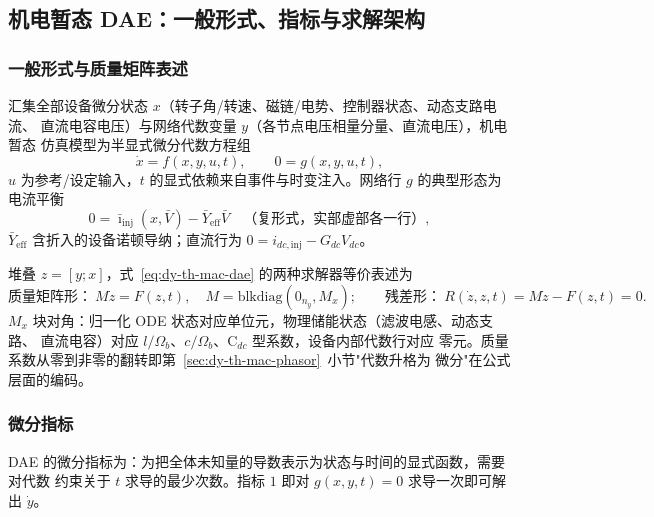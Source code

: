 \subsection{机电暂态 DAE：一般形式、指标与求解架构}\label{sec:dy-th-mac-dae}

\subsubsection{一般形式与质量矩阵表述}

汇集全部设备微分状态 $x$（转子角/转速、磁链/电势、控制器状态、动态支路电流、
直流电容电压）与网络代数变量 $y$（各节点电压相量分量、直流电压），机电暂态
仿真模型为半显式微分代数方程组
\begin{equation}
\dot x=f(x,y,u,t),\qquad 0=g(x,y,u,t),
\label{eq:dy-th-mac-dae}
\end{equation}
$u$ 为参考/设定输入，$t$ 的显式依赖来自事件与时变注入。网络行
$g$ 的典型形态为电流平衡
\begin{equation}
0=\bar\imath_{\mathrm{inj}}(x,\bar V)-\bar Y_{\mathrm{eff}}\bar V
\quad\text{（复形式，实部虚部各一行）},
\label{eq:dy-th-mac-netrow}
\end{equation}
$\bar Y_{\mathrm{eff}}$ 含折入的设备诺顿导纳；直流行为
$0=i_{dc,\mathrm{inj}}-G_{dc}V_{dc}$。

\begin{definition}[质量矩阵形与残差形]\label{def:dy-th-mac-massform}
堆叠 $z=[y;x]$，式~\eqref{eq:dy-th-mac-dae} 的两种求解器等价表述为
\begin{equation}
\text{质量矩阵形：}\ M\dot z=F(z,t),\quad M=\mathrm{blkdiag}(0_{n_y},M_x);
\qquad
\text{残差形：}\ R(\dot z,z,t)=M\dot z-F(z,t)=0 .
\label{eq:dy-th-mac-massform}
\end{equation}
$M_x$ 块对角：归一化 ODE 状态对应单位元，物理储能状态（滤波电感、动态支路、
直流电容）对应 $l/\Omega_b$、$c/\Omega_b$、C$_{dc}$ 型系数，设备内部代数行对应
零元。质量系数从零到非零的翻转即第~\ref{sec:dy-th-mac-phasor}~小节"代数升格为
微分"在公式层面的编码。
\end{definition}

\subsubsection{微分指标}

\begin{definition}\label{def:dy-th-mac-index}
DAE 的微分指标为：为把全体未知量的导数表示为状态与时间的显式函数，需要对代数
约束关于 $t$ 求导的最少次数。指标 $1$ 即对 $g(x,y,t)=0$ 求导一次即可解出 $\dot y$。
\end{definition}

